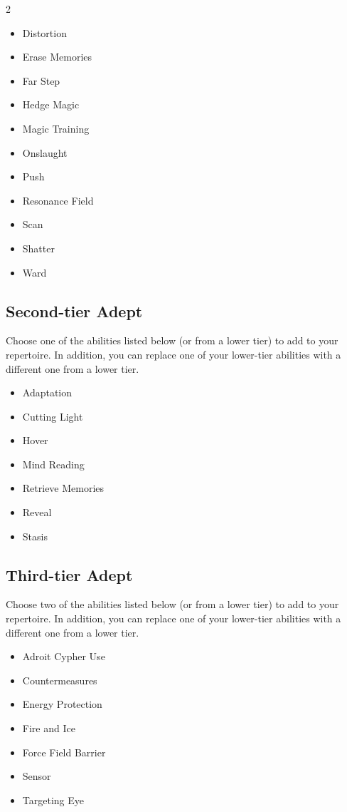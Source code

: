 \begin{multicols}{2}
\begin{itemize}
\item Distortion
\item Erase Memories 
\item Far Step
\item Hedge Magic
\item Magic Training
\item Onslaught
\item Push
\item Resonance Field
\item Scan
\item Shatter
\item Ward
\end{itemize}

\subsection{Second-tier Adept}

Choose one of the abilities listed below (or from a lower tier) to add to your repertoire. In addition, you can replace one of your lower-tier abilities with a different one from a lower tier.

\begin{itemize}
\item Adaptation
\item Cutting Light
\item Hover
\item Mind Reading 
\item Retrieve Memories
\item Reveal
\item Stasis
\end{itemize}

\subsection{Third-tier Adept}

Choose two of the abilities listed below (or from a lower tier) to add to your repertoire. In addition, you can replace one of your lower-tier abilities with a different one from a lower tier.

\begin{itemize}
\item Adroit Cypher Use
\item Countermeasures
\item Energy Protection
\item Fire and Ice
\item Force Field Barrier
\item Sensor
\item Targeting Eye
\end{itemize}


\end{multicols}
